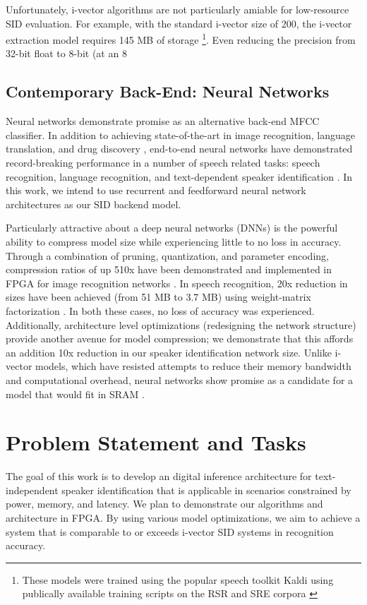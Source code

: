 \documentclass[journal,12pt,onecolumn,draftclsnofoot,]{sty/IEEEtran}
\begin{document}
Unfortunately, i-vector algorithms are not particularly amiable for low-resource SID evaluation. For example, with the standard i-vector size of 200, the i-vector extraction model requires 145 MB of storage \footnote{These models were trained using the popular speech toolkit Kaldi using publically available training scripts on the RSR and SRE corpora \cite{kaldi, sre, rsr}}. Even reducing the precision from 32-bit float to 8-bit (at an 8%

\subsection{Contemporary Back-End: Neural Networks}
\label{backend}
Neural networks demonstrate promise as an alternative back-end MFCC classifier. In addition to achieving state-of-the-art in image recognition, language translation, and drug discovery \cite{imagenet, translation, drugs}, end-to-end neural networks have demonstrated record-breaking performance in a number of speech related tasks: speech recognition, language recognition, and text-dependent speaker identification \cite{speechrec, lidsid, smallfootprint}. In this work, we intend to use recurrent and feedforward neural network architectures as our SID backend model.

Particularly attractive about a deep neural networks (DNNs) is the powerful ability to compress model size while experiencing little to no loss in accuracy. Through a combination of pruning, quantization, and parameter encoding, compression ratios of up 510x have been demonstrated and implemented in FPGA for image recognition networks \cite{squeezenet}. In speech recognition, 20x reduction in sizes have been achieved (from 51 MB to 3.7 MB) using weight-matrix factorization \cite{smallfootprintasr}. In both these cases, no loss of accuracy was experienced. Additionally, architecture level optimizations (redesigning the network structure) provide another avenue for model compression; we demonstrate that this affords an addition 10x reduction in our speaker identification network size. Unlike i-vector models, which have resisted attempts to reduce their memory bandwidth and computational overhead, neural networks show promise as a candidate for a model that would fit in SRAM \cite{deepcompression}.

\section{Problem Statement and Tasks}
\label{problem}
The goal of this work is to develop an digital inference architecture for text-independent speaker identification that is applicable in scenarios constrained by power, memory, and latency. We plan to demonstrate our algorithms and architecture in FPGA. By using various model optimizations, we aim to achieve a system that is comparable to or exceeds i-vector SID systems in recognition accuracy.
\end{document}
